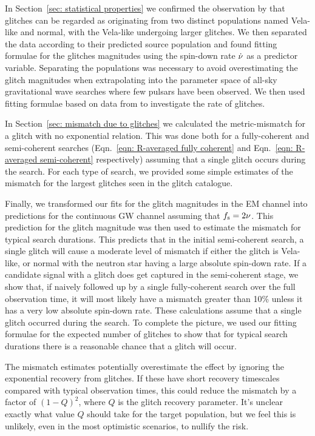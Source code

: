 \documentclass[../full_thesis/full_thesis.tex]{subfiles}
\begin{document}
In Section~\ref{sec: statistical properties} we confirmed the observation by
\citet{Espinoza2011} that glitches can be regarded as originating from two
distinct populations named Vela-like and normal, with the Vela-like undergoing
larger glitches. We then separated the data according to their predicted source
population and found fitting formulae for the glitches magnitudes using the
spin-down rate $\dot{\nu}$ as a predictor variable. Separating the populations
was necessary to avoid overestimating the glitch magnitudes when
extrapolating into the parameter space of all-sky gravitational wave searches where few pulsars
have been observed. We then used fitting formulae based on data from
\citet{Espinoza2011} to investigate the rate of glitches.

In Section~\ref{sec: mismatch due to glitches} we calculated the metric-mismatch for a
glitch with no exponential relation. This was done both for a
fully-coherent and semi-coherent searches (Eqn.~\eqref{eqn: R-averaged fully
coherent} and Eqn.~\eqref{eqn: R-averaged semi-coherent} respectively) assuming
that a single glitch occurs during the search. For each type of search, we provided
some simple estimates of the mismatch for the largest glitches seen in the
glitch catalogue.

Finally, we transformed our fits for the glitch magnitudes in the EM channel
into predictions for the continuous GW channel assuming that $f_{\textrm{s}}=2\nu$. This
prediction for the glitch magnitude was then used to estimate the mismatch for
typical search durations. This predicts that in the initial semi-coherent
search, a single glitch will cause a moderate level of mismatch if either the glitch
is Vela-like, or normal with the neutron star having a large absolute spin-down
rate. If a candidate signal with a glitch does get captured in the
semi-coherent stage, we show that, if naively followed up by a single
fully-coherent search over the full observation time, it will most likely have
a mismatch greater than 10\% unless it has a very low absolute spin-down rate.
These calculations assume that a single glitch occurred during the search. To
complete the picture, we used our fitting formulae for the expected number of
glitches to show that for typical search durations there is a reasonable chance
that a glitch will occur.

The mismatch estimates potentially overestimate the effect by ignoring
the exponential recovery from glitches. If these have short recovery timescales
compared with typical observation times, this could reduce the mismatch by a
factor of $(1-Q)^{2}$, where $Q$ is the glitch recovery parameter. It's unclear
exactly what value $Q$ should take for the target population, but we feel this
is unlikely, even in the most optimistic scenarios, to nullify the risk.
\end{document}
